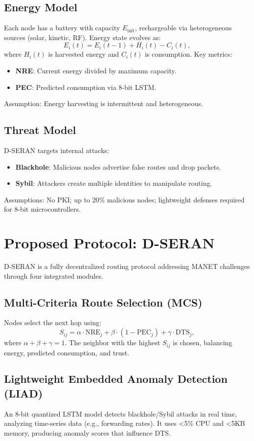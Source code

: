 \documentclass[preprint]{elsarticle}
\begin{document}
\subsection{Energy Model}
Each node has a battery with capacity \( E_{\text{init}} \), rechargeable via heterogeneous sources (solar, kinetic, RF). Energy state evolves as:
\[ E_i(t) = E_i(t-1) + H_i(t) - C_i(t), \]
where \( H_i(t) \) is harvested energy and \( C_i(t) \) is consumption. Key metrics:
\begin{itemize}
    \item \textbf{NRE}: Current energy divided by maximum capacity.
    \item \textbf{PEC}: Predicted consumption via 8-bit LSTM.
\end{itemize}
Assumption: Energy harvesting is intermittent and heterogeneous.

\subsection{Threat Model}
D-SERAN targets internal attacks:
\begin{itemize}
    \item \textbf{Blackhole}: Malicious nodes advertise false routes and drop packets.
    \item \textbf{Sybil}: Attackers create multiple identities to manipulate routing.
\end{itemize}
Assumptions: No PKI; up to 20\% malicious nodes; lightweight defenses required for 8-bit microcontrollers.

\section{Proposed Protocol: D-SERAN}
\label{sec:protocol}

D-SERAN is a fully decentralized routing protocol addressing MANET challenges through four integrated modules.

\subsection{Multi-Criteria Route Selection (MCS)}
Nodes select the next hop using:
\[ S_{ij} = \alpha \cdot \text{NRE}_j + \beta \cdot (1 - \text{PEC}_j) + \gamma \cdot \text{DTS}_j, \]
where \( \alpha + \beta + \gamma = 1 \). The neighbor with the highest \( S_{ij} \) is chosen, balancing energy, predicted consumption, and trust.

\subsection{Lightweight Embedded Anomaly Detection (LIAD)}
An 8-bit quantized LSTM model detects blackhole/Sybil attacks in real time, analyzing time-series data (e.g., forwarding rates). It uses <5\% CPU and <5KB memory, producing anomaly scores that influence DTS.
\end{document}
